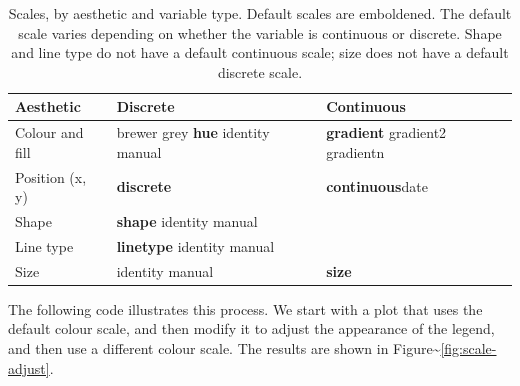 \begin{table}
  \begin{center}
  \begin{tabular}{p{1in}p{1in}p{1in}}
    \toprule
    Aesthetic & Discrete & Continuous \\
    \midrule
    Colour and fill & brewer \newline grey \newline \textbf{hue} \newline identity \newline manual & \textbf{gradient} \newline gradient2 \newline gradientn \\[0.5em]
    Position (x, y) & \textbf{discrete} & \textbf{continuous}\newline date \\[0.5em]
    Shape & \textbf{shape} \newline identity \newline manual  \\[0.5em]
    Line type & \textbf{linetype} \newline identity \newline manual \\[0.5em]
    Size & identity \newline manual & \textbf{size} \\
    \bottomrule
  \end{tabular}
  \end{center}
  \caption{Scales, by aesthetic and variable type.  Default scales are emboldened. The default scale varies depending on whether the variable is continuous or discrete.  Shape and line type do not have a default continuous scale; size does not have a default discrete scale.}
  \label{tbl:default-scales}
\end{table}

The following code illustrates this process. We start with a plot that
uses the default colour scale, and then modify it to adjust the
appearance of the legend, and then use a different colour scale. The
results are shown in Figure\textasciitilde{}\ref{fig:scale-adjust}.

\begin{Shaded}
\begin{Highlighting}[]
\StringTok{ }  
\end{Highlighting}
\end{Shaded}

